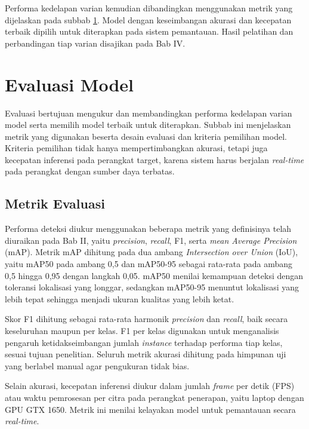 Performa kedelapan varian kemudian dibandingkan menggunakan metrik yang dijelaskan pada 
subbab \ref{sec:evaluasi}. Model dengan keseimbangan akurasi dan kecepatan terbaik dipilih 
untuk diterapkan pada sistem pemantauan. Hasil pelatihan dan perbandingan tiap varian 
disajikan pada Bab IV.

\section{Evaluasi Model}
\label{sec:evaluasi}

Evaluasi bertujuan mengukur dan membandingkan performa kedelapan varian model serta 
memilih model terbaik untuk diterapkan. Subbab ini menjelaskan metrik yang digunakan 
beserta desain evaluasi dan kriteria pemilihan model. Kriteria pemilihan tidak hanya 
mempertimbangkan akurasi, tetapi juga kecepatan inferensi pada perangkat target, karena 
sistem harus berjalan \textit{real-time} pada perangkat dengan sumber daya terbatas.

\subsection{Metrik Evaluasi}

Performa deteksi diukur menggunakan beberapa metrik yang definisinya telah diuraikan pada 
Bab II, yaitu \textit{precision}, \textit{recall}, F1, serta 
\textit{mean Average Precision} (mAP). Metrik mAP dihitung pada dua ambang 
\textit{Intersection over Union} (IoU), yaitu mAP50 pada ambang 0,5 dan mAP50-95 sebagai 
rata-rata pada ambang 0,5 hingga 0,95 dengan langkah 0,05. mAP50 menilai kemampuan deteksi 
dengan toleransi lokalisasi yang longgar, sedangkan mAP50-95 menuntut lokalisasi yang 
lebih tepat sehingga menjadi ukuran kualitas yang lebih ketat.

Skor F1 dihitung sebagai rata-rata harmonik \textit{precision} dan \textit{recall}, baik 
secara keseluruhan maupun per kelas. F1 per kelas digunakan untuk menganalisis pengaruh 
ketidakseimbangan jumlah \textit{instance} terhadap performa tiap kelas, sesuai tujuan 
penelitian. Seluruh metrik akurasi dihitung pada himpunan uji yang berlabel manual agar 
pengukuran tidak bias.

Selain akurasi, kecepatan inferensi diukur dalam jumlah \textit{frame} per detik (FPS) 
atau waktu pemrosesan per citra pada perangkat penerapan, yaitu laptop dengan GPU GTX 1650. 
Metrik ini menilai kelayakan model untuk pemantauan secara \textit{real-time}.

